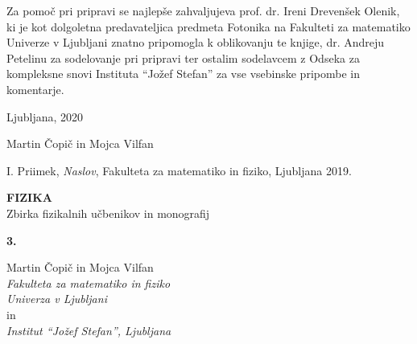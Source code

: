 \documentclass[a4paper,10pt,fleqn]{book}
\begin{document}
Za pomoč pri pripravi se najlepše zahvaljujeva prof. dr. Ireni Drevenšek 
Olenik, ki je kot dolgoletna predavateljica predmeta Fotonika na Fakulteti za 
matematiko Univerze v Ljubljani znatno pripomogla k oblikovanju 
te knjige, dr. Andreju Petelinu za sodelovanje pri pripravi ter 
ostalim sodelavcem z Odseka za kompleksne snovi 
Instituta ``Jožef Stefan'' za vse vsebinske pripombe
in komentarje.

\vspace{1em}

Ljubljana, 2020

\hfill 
Martin Čopič in Mojca Vilfan


\lihastran
\tableofcontents


\lihastran













\lihastran
{}
\begin{thebibliography}{9}

   I. Priimek,
   \emph{Naslov},
   Fakulteta za matematiko in fiziko, Ljubljana 2019.

\end{thebibliography}


\lihastran
{}
\sloppy
\raggedright
\footnotesize
\printindex
\normalsize


\sodastran
\thispagestyle{empty}
\parindent=0pt

\textbf{FIZIKA} \\
Zbirka fizikalnih učbenikov in monografij

\bigskip
\bigskip
\textbf{\large 3.}

\bigskip
Martin Čopič in Mojca Vilfan\\
{\it Fakulteta za matematiko in fiziko\\
Univerza v Ljubljani}\\
in\\
{\it Institut ``Jožef Stefan'', Ljubljana}\\
\end{document}
